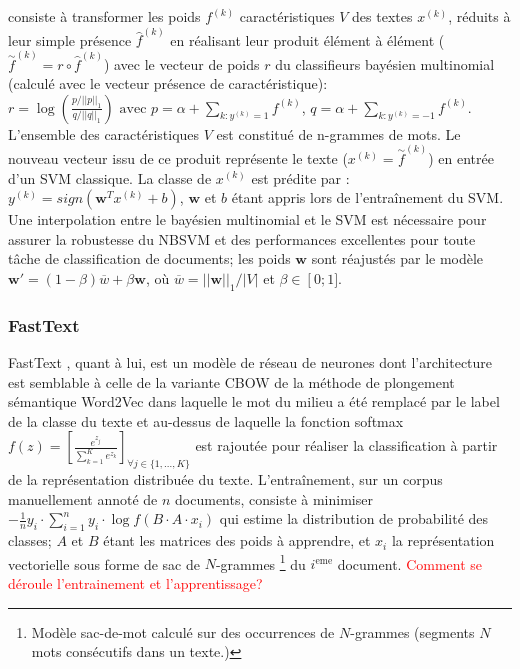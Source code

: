 consiste à transformer les poids $f^{(k)}$ caractéristiques $V$ des textes $x^{(k)}$, réduits à leur simple présence $\widehat{f}^{(k)}$ en réalisant leur produit élément à élément ($\overset{\sim}{f}^{(k)} = {r} \circ \widehat{f}^{(k)}$) avec le vecteur de poids $r$ du classifieurs bayésien multinomial (calculé avec le vecteur présence de caractéristique):
$r = \log \left(\frac{p/\vert\vert p \vert\vert_1}{q / \vert\vert q \vert\vert_1}\right)
\text{ avec } p=\alpha + \sum\limits_{k:y^{(k)}=1}{f}^{(k)}$, $q=\alpha + \sum\limits_{k:y^{(k)}=-1}{f}^{(k)}$. L'ensemble des caractéristiques $V$ est constitué de n-grammes de mots. Le nouveau vecteur issu de ce produit représente le texte ($x^{(k)} = \overset{\sim}{f}^{(k)}$) en entrée d'un SVM classique. La classe de $x^{(k)}$ est prédite par : $y^{(k)} = sign(\mathbf{w}^Tx^{(k)} + b)$, $\mathbf{w}$ et $b$ étant appris lors de l'entraînement du SVM. Une interpolation entre le bayésien multinomial et le SVM est nécessaire pour assurer la robustesse du NBSVM et des performances excellentes pour toute tâche de classification de documents; les poids $\mathbf{w}$ sont réajustés par le modèle $\mathbf{w'} = (1 - \beta) \overline{w} + \beta \mathbf{w}$, où $\overline{w} = \vert\vert \mathbf{w}\vert\vert_1 / \vert V \vert$ et $\beta \in \left[0; 1] \right.$. 
 

\subsubsection{FastText}
 
 FastText \citep{grave2017fasttextcls}, quant à lui, est un modèle de réseau de neurones dont l'architecture est semblable à celle de la variante CBOW de la méthode de plongement sémantique Word2Vec \citep{mikolov2013word2vec} dans laquelle le mot du milieu a été remplacé par le label de la classe du texte et au-dessus de laquelle la fonction softmax $f(z) = \left[ \frac{e^{z_j}}{\sum\limits_{k=1}^K e^{z_k}} \right]_{\forall j \in \lbrace 1, ..., K \rbrace} $ est rajoutée pour réaliser la classification à partir de la représentation distribuée du texte. L'entraînement, sur un corpus manuellement annoté de $n$ documents, consiste à minimiser $-\frac{1}{n}y_i \cdot \sum\limits_{i=1}^n y_i \cdot \log{f(B\cdot A\cdot x_i)}$ qui estime la distribution de probabilité des classes; $A$ et $B$ étant les matrices des poids à apprendre, et $x_i$ la représentation vectorielle sous forme de \og sac de $N$-grammes \fg{}\footnote{Modèle sac-de-mot calculé sur des occurrences de $N$-grammes (segments $N$ mots consécutifs dans un texte.)} du $i^\text{eme}$ document. \textcolor{red}{Comment se déroule l'entrainement et l'apprentissage?}

